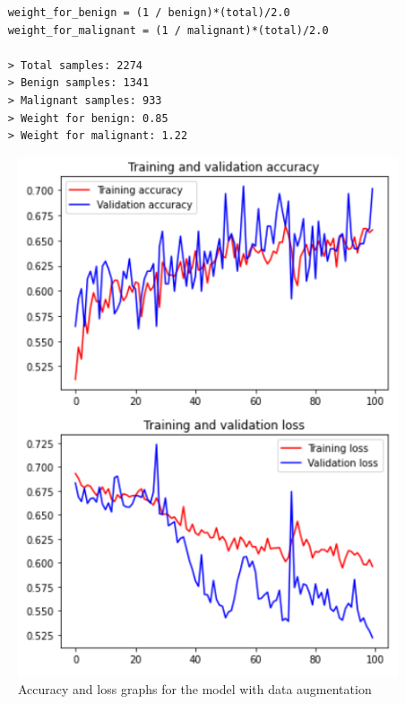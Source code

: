 \documentclass[11pt,a4paper,oneside]{article}
\begin{document}
\begin{verbatim}
    weight_for_benign = (1 / benign)*(total)/2.0 
    weight_for_malignant = (1 / malignant)*(total)/2.0
    
    > Total samples: 2274
    > Benign samples: 1341
    > Malignant samples: 933
    > Weight for benign: 0.85
    > Weight for malignant: 1.22
\end{verbatim}

\begin{figure}[h]
\centering
	\begin{minipage}[c]{.4\textwidth}
		\centering\setlength{\captionmargin}{0pt}%
		\includegraphics[width=.9\textwidth]{images/2.2/7_acc}
		\caption{Accuracy and loss graphs for the model with data augmentation}
		\label{fig:accuracy_2.2_1_weights}
	\end{minipage}
	\hspace{5mm}%
	\begin{minipage}[c]{.4\textwidth}
		\centering\setlength{\captionmargin}{0pt}%

\end{minipage}
\end{figure}
\end{document}
